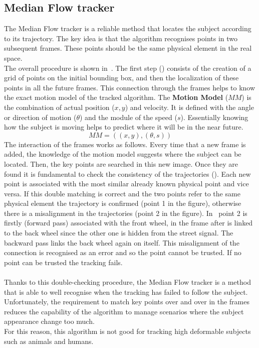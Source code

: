 \subsection{Median Flow tracker} \label{sec:medianflow}
The Median Flow tracker\cite{medianFlow} is a reliable method that locates the subject according to its trajectory. The key idea is that the algorithm recognises points in two subsequent frames. These points should be the same physical element in the real space.\\
The overall procedure is shown in~. The first step () consists of the creation of a grid of points on the initial bounding box, and then the localization of these points in all the future frames. This connection through the frames helps to know the exact motion model of the tracked algorithm. The \textbf{Motion Model} ($MM$) is the combination of actual position ($x, y$) and velocity. It is defined with the angle or direction of motion ($\theta$) and the module of the speed ($s$). Essentially knowing how the subject is moving helps to predict where it will be in the near future.
$$MM = ((x, y), (\theta, s))$$
The interaction of the frames works as follows. Every time that a new frame is added, the knowledge of the motion model suggests where the subject can be located. Then, the key points are searched in this new image. Once they are found it is fundamental to check the consistency of the trajectories (). Each new point is associated with the most similar already known physical point and vice versa. If this double matching is correct and the two points refer to the same physical element the trajectory is confirmed (point 1 in the figure), otherwise there is a misalignment in the trajectories (point 2 in the figure). In~ point 2 is firstly (forward pass) associated with the front wheel, in the frame after is linked to the back wheel since the other one is hidden from the street signal. The backward pass links the back wheel again on itself. This misalignment of the connection is recognised as an error and so the point cannot be trusted. If no point can be trusted the tracking fails.\\
\\
Thanks to this double-checking procedure, the Median Flow tracker is a method that is able to well recognise when the tracking has failed to follow the subject. Unfortunately, the requirement to match key points over and over in the frames reduces the capability of the algorithm to manage scenarios where the subject appearance change too much.\\
For this reason, this algorithm is not good for tracking high deformable subjects such as animals and humans.

